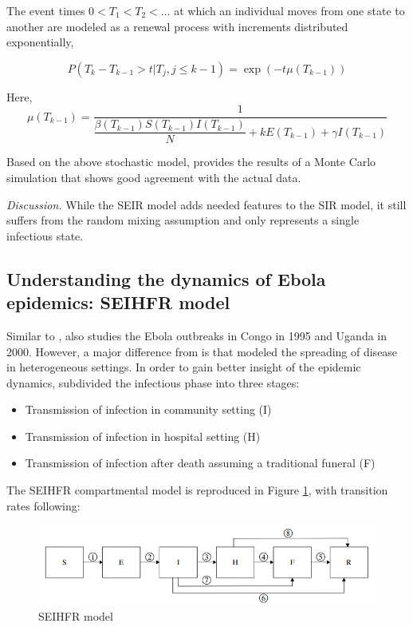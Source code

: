\documentclass[10pt, journal,onecolumn]{IEEEtran}
\begin{document}
The event times $0<T_1<T_2<\ldots$ at which an individual moves from one state to another are modeled as a renewal process with increments distributed exponentially,

\begin{equation}
P(T_k-T_{k-1} > t | T_j, j\leq k-1) = \exp(-t \mu (T_{k-1}) )
\end{equation}

Here,
\[
\mu (T_{k-1}) = \frac{1}{\dfrac{\beta(T_{k-1}) S(T_{k-1}) I(T_{k-1})}{N} + k E(T_{k-1}) + \gamma I(T_{k-1})}
\]

Based on the above stochastic model, \citep{chowell2004basic} provides the results of a Monte Carlo
simulation that shows good agreement with the actual data.

\textit{Discussion.} While the SEIR model adds needed features to the SIR model, it still suffers
from the random mixing assumption and only represents a single infectious state.

\subsection{\textbf{Understanding the dynamics of Ebola epidemics: SEIHFR model \citep{legrand2007understanding}}}

Similar to \citep{chowell2004basic}, \citep{legrand2007understanding} also studies the Ebola
outbreaks in Congo in 1995 and Uganda in 2000. However, a major difference from
\citep{chowell2004basic} is that \citep{legrand2007understanding} modeled the spreading of disease
in heterogeneous settings. In order to gain better insight of the epidemic dynamics,
\citep{legrand2007understanding} subdivided the infectious phase into three stages:

\begin{itemize}
\item Transmission of infection in community setting (I)
\item Transmission of infection in hospital setting (H)
\item Transmission of infection after death assuming a traditional funeral (F)
\end{itemize}


The SEIHFR compartmental model is reproduced in Figure \ref{fig:SEIHFR_model}, with transition rates
following:

\begin{figure}[h!]
\centering
\includegraphics[scale=0.5]{seihfr_model_fig}
\caption{SEIHFR model}
\label{fig:SEIHFR_model}
\end{figure}
\end{document}
